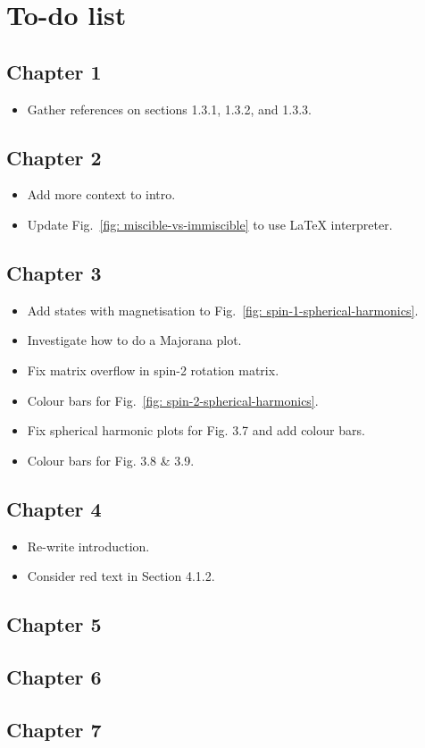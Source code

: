 \section{To-do list}

\subsection{Chapter 1}
\begin{itemize}
    \item Gather references on sections 1.3.1, 1.3.2, and 1.3.3.
\end{itemize}

\subsection{Chapter 2}
\begin{itemize}
    \item Add more context to intro.
    \item Update Fig.~\ref{fig: miscible-vs-immiscible} to use \LaTeX
          interpreter.
\end{itemize}

\subsection{Chapter 3}
\begin{itemize}
    \item Add states with magnetisation to
          Fig.~\ref{fig: spin-1-spherical-harmonics}.
    \item Investigate how to do a Majorana plot.
    \item Fix matrix overflow in spin-2 rotation matrix.
    \item Colour bars for Fig.~\ref{fig: spin-2-spherical-harmonics}.
    \item Fix spherical harmonic plots for Fig. 3.7 and add colour bars.
    \item Colour bars for Fig. 3.8 \& 3.9.
\end{itemize}

\subsection{Chapter 4}
\begin{itemize}
    \item Re-write introduction.
    \item Consider red text in Section 4.1.2.
\end{itemize}
\subsection{Chapter 5}
\subsection{Chapter 6}
\subsection{Chapter 7}

